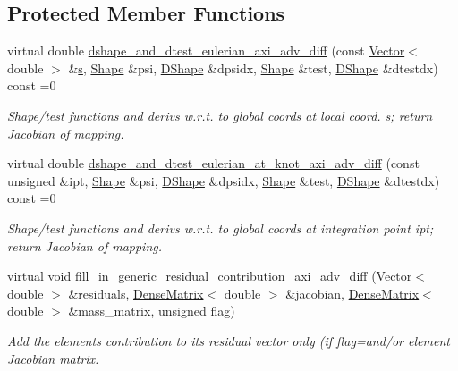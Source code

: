 \subsection*{Protected Member Functions}
\begin{DoxyCompactItemize}
\item 
virtual double \hyperlink{classoomph_1_1AxisymAdvectionDiffusionEquations_a92b918f392733e6128e192c2fbdb478c}{dshape\+\_\+and\+\_\+dtest\+\_\+eulerian\+\_\+axi\+\_\+adv\+\_\+diff} (const \hyperlink{classoomph_1_1Vector}{Vector}$<$ double $>$ \&\hyperlink{cfortran_8h_ab7123126e4885ef647dd9c6e3807a21c}{s}, \hyperlink{classoomph_1_1Shape}{Shape} \&psi, \hyperlink{classoomph_1_1DShape}{D\+Shape} \&dpsidx, \hyperlink{classoomph_1_1Shape}{Shape} \&test, \hyperlink{classoomph_1_1DShape}{D\+Shape} \&dtestdx) const =0
\begin{DoxyCompactList}\small\item\em Shape/test functions and derivs w.\+r.\+t. to global coords at local coord. s; return Jacobian of mapping. \end{DoxyCompactList}\item 
virtual double \hyperlink{classoomph_1_1AxisymAdvectionDiffusionEquations_a6d844cf194aa8fa462bbfcda811b24ca}{dshape\+\_\+and\+\_\+dtest\+\_\+eulerian\+\_\+at\+\_\+knot\+\_\+axi\+\_\+adv\+\_\+diff} (const unsigned \&ipt, \hyperlink{classoomph_1_1Shape}{Shape} \&psi, \hyperlink{classoomph_1_1DShape}{D\+Shape} \&dpsidx, \hyperlink{classoomph_1_1Shape}{Shape} \&test, \hyperlink{classoomph_1_1DShape}{D\+Shape} \&dtestdx) const =0
\begin{DoxyCompactList}\small\item\em Shape/test functions and derivs w.\+r.\+t. to global coords at integration point ipt; return Jacobian of mapping. \end{DoxyCompactList}\item 
virtual void \hyperlink{classoomph_1_1AxisymAdvectionDiffusionEquations_a19bf92fed341de2d09b444b3ab71096e}{fill\+\_\+in\+\_\+generic\+\_\+residual\+\_\+contribution\+\_\+axi\+\_\+adv\+\_\+diff} (\hyperlink{classoomph_1_1Vector}{Vector}$<$ double $>$ \&residuals, \hyperlink{classoomph_1_1DenseMatrix}{Dense\+Matrix}$<$ double $>$ \&jacobian, \hyperlink{classoomph_1_1DenseMatrix}{Dense\+Matrix}$<$ double $>$ \&mass\+\_\+matrix, unsigned flag)
\begin{DoxyCompactList}\small\item\em Add the element\textquotesingle{}s contribution to its residual vector only (if flag=and/or element Jacobian matrix. \end{DoxyCompactList}\end{DoxyCompactItemize}
